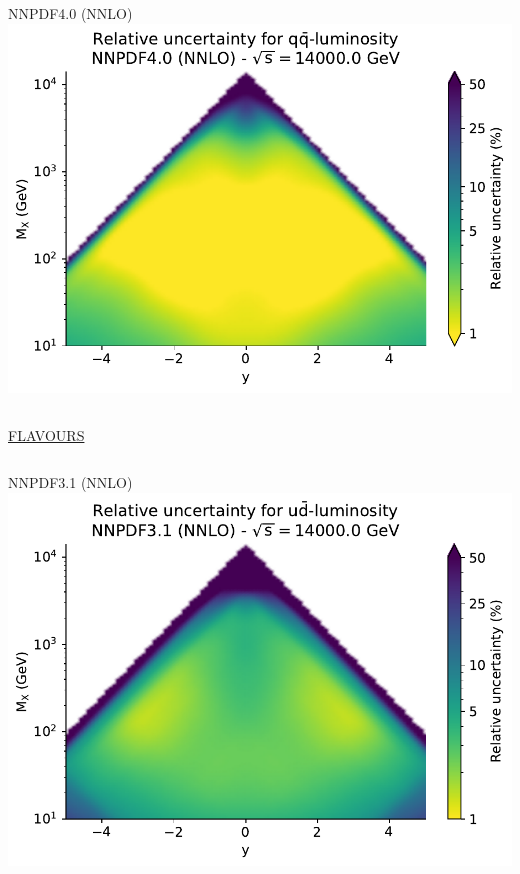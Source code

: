 \documentclass{beamer}
\begin{document}
\begin{frame}
\begin{overlayarea}{\textwidth}{5.2cm}
{\begin{columns}[c]
   \begin{column}{0.5\textwidth}
    \centering
        NNPDF4.0 (NNLO)\\
        \vspace{0.1cm}
        \includegraphics[width=\columnwidth]{plots/plot_lumi2d_uncertainty_NNPDF40_qqbar}\\    
   \end{column}
  \end{columns}  
  }
  {
  \centering
  \underline{FLAVOURS}\\
  \begin{columns}[c]
   \begin{column}{0.5\textwidth}
    \centering
        NNPDF3.1 (NNLO)\\
        \vspace{0.1cm}
        \includegraphics[width=\columnwidth]{plots/plot_lumi2d_uncertainty_NNPDF31_udbar}\\

\end{column}
\end{columns}}
\end{overlayarea}
\end{frame}
\end{document}
